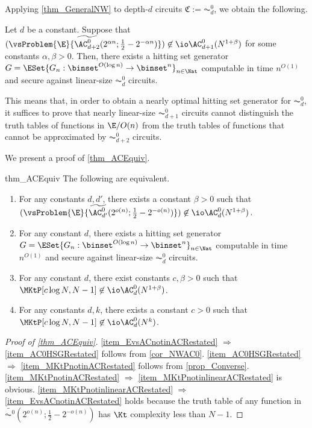 \documentclass{toc}
\begin{document}
Applying \cref{thm_GeneralNW} to depth-$d$ circuits $\mathfrak{C} := \AC^0_d$,
we obtain the following.
\begin{corollary}
  \label{cor_NWAC0}
  Let $d$ be a constant.
  Suppose that
  $(\vsProblem{\E}{\widetilde{\AC^{0}_{d+2}} (2^{\alpha n} ; \frac{1}{2} - 2^{- \alpha n})} ) \not\in \io \AC^0_{d+1} (N^{1 + \beta})$
  for some constants $\alpha, \beta > 0$.
  Then,
  there exists a hitting set generator $G = \ESet{ G_n : \binset^{O(\log n)} \to \binset^n }_{n \in \Nat} $ computable in time $n^{O(1)}$ and secure against linear-size $\AC^0_{d}$ circuits.
\end{corollary}
This means that, in order to obtain a nearly optimal hitting set generator for $\AC^0_d$,
it suffices to prove that nearly linear-size $\AC^0_{d+1}$ circuits cannot distinguish the truth tables of functions in $\E/O(n)$
from the truth tables of functions that cannot be approximated by $\AC^0_{d+2}$ circuits.

We present a proof of \cref{thm_ACEquiv}.
\begin{restatetheorem}
  {thm_ACEquiv}
  The following are equivalent.
  \begin{enumerate}
    \item
          \label{item_EvsACnotinACRestated}
          For any constants $d, d'$,
          there exists a constant $\beta > 0$ such that
          $(\vsProblem{\E}{\widetilde{\AC_{d'}^0} (2^{o( n)} ; \frac{1}{2} - 2^{- o(n)})}) \not\in \io\AC^0_d(N^{1 + \beta})$.
    \item
          \label{item_AC0HSGRestated}
          For any constant $d$,
          there exists a hitting set generator $G = \ESet{ G_n : \binset^{O(\log n)} \to \binset^n }_{n \in \Nat} $ computable in time $n^{O(1)}$ and secure against linear-size $\AC_d^0$ circuits.
    \item
          \label{item_MKtPnotinlinearACRestated}
          For any constant $d$, there exist constants $c, \beta > 0$ such that
          $\MKtP[c \log N, N - 1] \not\in \io \AC_d^0(N^{1 + \beta})$.
    \item
          \label{item_MKtPnotinACRestated}
          For any constants $d, k$, there exists a constant $c > 0$ such that
          $\MKtP[c \log N, N - 1] \not\in \io \AC_d^0(N^{k})$.
  \end{enumerate}
\end{restatetheorem}


\begin{proof}
  [Proof of \cref{thm_ACEquiv}]
  \cref{item_EvsACnotinACRestated} $\Longrightarrow$
  \cref{item_AC0HSGRestated}
  follows from \cref{cor_NWAC0}.
  \cref{item_AC0HSGRestated}
  $\Longrightarrow$
  \cref{item_MKtPnotinACRestated}
  follows from \cref{prop_Converse}.
  \cref{item_MKtPnotinACRestated}
  $\Longrightarrow$
  \cref{item_MKtPnotinlinearACRestated}
  is obvious.
  \cref{item_MKtPnotinlinearACRestated}
  $\Longrightarrow$
  \cref{item_EvsACnotinACRestated}
  holds because the truth table of any function in $\widetilde{\AC^0}(2^{o(n)}; \frac{1}{2} - 2^{- o(n)})$
  has $\Kt$ complexity less than $N - 1$.
\end{proof}
\end{document}
